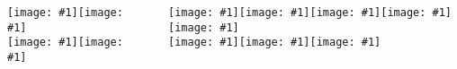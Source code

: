 \documentclass[final,table,14pt,aspectratio=43]{beamer}
\newcommand{\figheight}{.05\textheight}
\newcommand{\putlogo}[1]{\texttt{[image: \#1]}}
\newcommand{\putlogoB}[1]{\texttt{[image: \#1]}}
\begin{document}
\begin{frame}[fragile]
\begin{columns}[totalwidth=1.\textwidth,c]
\vspace{.1cm}

\putlogo{logo_gher}\hspace{.5cm}\putlogo{logo_ulg}\\ 
\putlogo{logo_imedea}\hspace{.5cm}\putlogo{logo_whoi}

~

\scriptsize
\putlogo{coq_wallon}\hspace{.5cm}\putlogo{logo_IOC}\hspace{.5cm}\putlogo{logoSocib}\hspace{.5cm}\putlogo{logo_CNES}\hspace{.5cm}\putlogo{logo_esa}\\
\putlogo{logo_nasa}\hspace{.5cm}\putlogo{logo_onr}\hspace{.5cm}\putlogo{logo_iugg}%

\end{columns}

\end{frame}
\end{document}
